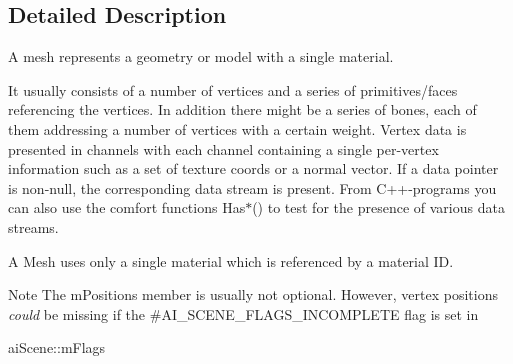\subsection{Detailed Description}
A mesh represents a geometry or model with a single material. 

It usually consists of a number of vertices and a series of primitives/faces referencing the vertices. In addition there might be a series of bones, each of them addressing a number of vertices with a certain weight. Vertex data is presented in channels with each channel containing a single per-\/vertex information such as a set of texture coords or a normal vector. If a data pointer is non-\/null, the corresponding data stream is present. From C++-\/programs you can also use the comfort functions Has$\ast$() to test for the presence of various data streams.

A Mesh uses only a single material which is referenced by a material I\-D. \begin{DoxyNote}{Note}
The m\-Positions member is usually not optional. However, vertex positions {\itshape could} be missing if the \#\-A\-I\-\_\-\-S\-C\-E\-N\-E\-\_\-\-F\-L\-A\-G\-S\-\_\-\-I\-N\-C\-O\-M\-P\-L\-E\-T\-E flag is set in 
\begin{DoxyCode}
aiScene::mFlags
\end{DoxyCode}
 
\end{DoxyNote}


